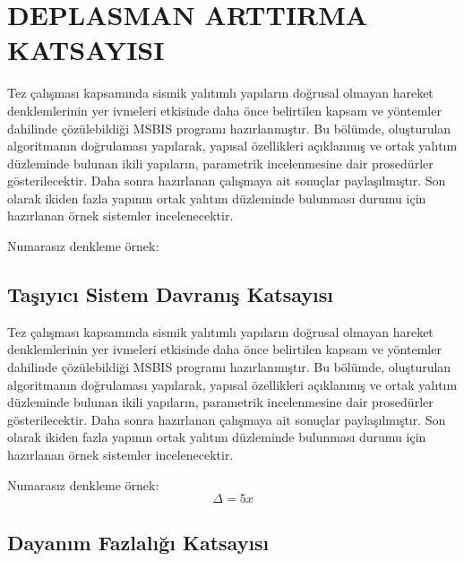 
\chapter{DEPLASMAN ARTTIRMA KATSAYISI}

\label{CH3} 

Tez çalışması kapsamında sismik yalıtımlı yapıların doğrusal olmayan
hareket denklemlerinin yer ivmeleri etkisinde daha önce belirtilen
kapsam ve yöntemler dahilinde çözülebildiği MSBIS programı hazırlanmıştır.
Bu bölümde, oluşturulan algoritmanın doğrulaması yapılarak, yapısal
özellikleri açıklanmış ve ortak yalıtım düzleminde bulunan ikili yapıların,
parametrik incelenmesine dair prosedürler gösterilecektir. Daha sonra
hazırlanan çalışmaya ait sonuçlar paylaşılmıştır. Son olarak ikiden
fazla yapının ortak yalıtım düzleminde bulunması durumu için hazırlanan
örnek sistemler incelenecektir.

Numarasız denkleme örnek:

\section{Taşıyıcı Sistem Davranış Katsayısı}

Tez çalışması kapsamında sismik yalıtımlı yapıların doğrusal olmayan
hareket denklemlerinin yer ivmeleri etkisinde daha önce belirtilen
kapsam ve yöntemler dahilinde çözülebildiği MSBIS programı hazırlanmıştır.
Bu bölümde, oluşturulan algoritmanın doğrulaması yapılarak, yapısal
özellikleri açıklanmış ve ortak yalıtım düzleminde bulunan ikili yapıların,
parametrik incelenmesine dair prosedürler gösterilecektir. Daha sonra
hazırlanan çalışmaya ait sonuçlar paylaşılmıştır. Son olarak ikiden
fazla yapının ortak yalıtım düzleminde bulunması durumu için hazırlanan
örnek sistemler incelenecektir.

Numarasız denkleme örnek:
\[
\Delta=5x
\]


\section{Dayanım Fazlalığı Katsayısı}

